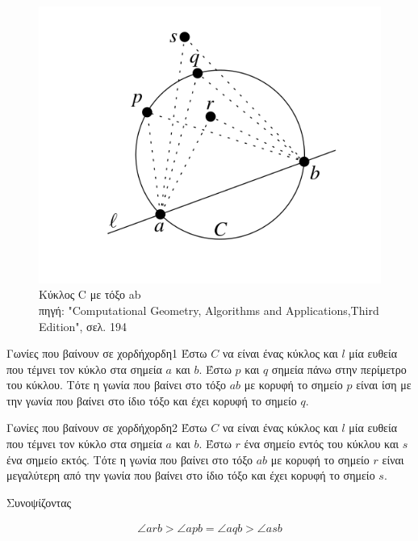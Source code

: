\documentclass[oneside,12pt]{book}
\newenvironment{matlab}
	{\begin{figure}[hp]\centering\captionsetup{justification=centering}}
	{\end{figure}}
\theoremstyle{definition}
\begin{document}
\begin{matlab}
	\includegraphics[scale=0.4]{images/circle.png}
	\caption{Κύκλος C με τόξο ab \\ πηγή: "Computational Geometry, Algorithms and Applications,Third Edition", σελ. 194}
\end{matlab}

\begin{mytheorem}{Γωνίες που βαίνουν σε χορδή}{χορδη1}
	Έστω \(C\) να είναι ένας κύκλος και \(l\) μία ευθεία που τέμνει τον κύκλο στα σημεία \(a\) και \(b\). Έστω \(p\) και \(q\) σημεία πάνω στην περίμετρο του κύκλου. Τότε η γωνία που βαίνει στο τόξο \(ab\) με κορυφή το σημείο \(p\) είναι ίση με την γωνία που βαίνει στο ίδιο τόξο και έχει κορυφή το σημείο \(q\).
\end{mytheorem}

\begin{mytheorem}{Γωνίες που βαίνουν σε χορδή}{χορδη2}
	Έστω \(C\) να είναι ένας κύκλος και \(l\) μία ευθεία που τέμνει τον κύκλο στα σημεία \(a\) και \(b\). Έστω \(r\) ένα σημείο εντός του κύκλου και \(s\) ένα σημείο εκτός. Τότε η γωνία που βαίνει στο τόξο \(ab\) με κορυφή το σημείο \(r\) είναι μεγαλύτερη από την γωνία που βαίνει στο ίδιο τόξο και έχει κορυφή το σημείο \(s\).
\end{mytheorem}

Συνοψίζοντας

\begin{align}
	\angle arb > \angle apb = \angle aqb > \angle asb
\end{align}
\end{document}
